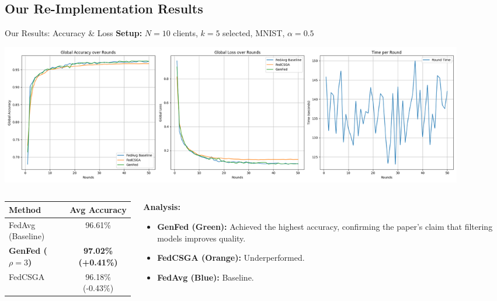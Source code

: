 \documentclass{beamer}
\begin{document}
\subsection{Our Re-Implementation Results}

\begin{frame}{Our Results: Accuracy \& Loss}
\textbf{Setup:} $N=10$ clients, $k=5$ selected, MNIST, $\alpha=0.5$

\begin{center}
\includegraphics[width=0.9\textwidth,keepaspectratio]{results.png}
\end{center}

\begin{columns}
\begin{column}{0.5\textwidth}
\begin{table}
\centering
\small
\begin{tabular}{lc}
\toprule
\textbf{Method} & \textbf{Avg Accuracy} \\
\midrule
FedAvg (Baseline) & 96.61\% \\
\textbf{GenFed ($\rho=3$)} & \textbf{97.02\% (+0.41\%)} \\
FedCSGA & 96.18\% (-0.43\%) \\
\bottomrule
\end{tabular}
\end{table}
\end{column}
\begin{column}{0.5\textwidth}
\textbf{Analysis:}
\begin{itemize}
    \item \textbf{\textcolor{genfedblue}{GenFed} (Green):} Achieved the highest accuracy, confirming the paper's claim that filtering models improves quality.
    \item \textbf{\textcolor{fedcsgaorange}{FedCSGA} (Orange):} Underperformed.
    \item \textbf{FedAvg (Blue):} Baseline.
\end{itemize}
\end{column}
\end{columns}
\end{frame}
\end{document}

